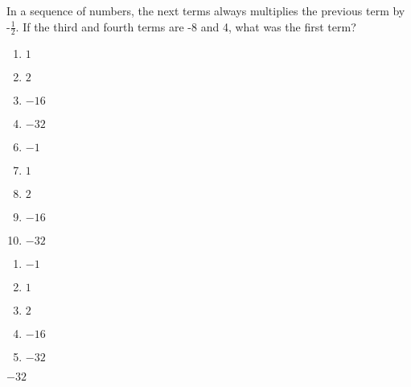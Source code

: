 In a sequence of numbers, the next terms always multiplies the previous term by -$\frac{1}{2}$. If the third and fourth terms are -8 and 4, what was the first term? 

\ifsat
	\begin{enumerate}[label=\Alph*)]
		\item  $1$ 
		\item  $2$ 
		\item  $-16$ 
		\item  $-32$ %
	\end{enumerate}
\else
\fi

\ifacteven
	\begin{enumerate}[label=\textbf{\Alph*.},itemsep=\fill,align=left]
		\setcounter{enumii}{5}
		\item   $-1$
		\item  $1$ 
		\item  $2$ 
		\addtocounter{enumii}{1}
		\item  $-16$ 
		\item  $-32$ %
	\end{enumerate}
\else
\fi

\ifactodd
	\begin{enumerate}[label=\textbf{\Alph*.},itemsep=\fill,align=left]
		\item   $-1$
		\item  $1$ 
		\item  $2$ 
		\item  $-16$ 
		\item  $-32$ %
	\end{enumerate}
\else
\fi

\ifgridin
  $-32$ %

\else
\fi

